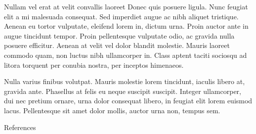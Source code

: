 \documentclass[final]{beamer}
\newlength{\sepwidth}
\newlength{\colwidth}
\newcommand{\separatorcolumn}{\begin{column}{\sepwidth}\end{column}}
\begin{document}
\begin{frame}[label={sec:orgc24fd89}]{}
\begin{block}{}
\begin{columns}
\begin{column}{\colwidth\columnwidth}
\begin{block}{Nullam vel erat at velit convallis laoreet}
Donec quis posuere ligula. Nunc feugiat elit a mi malesuada consequat. Sed
imperdiet augue ac nibh aliquet tristique. Aenean eu tortor vulputate, eleifend
lorem in, dictum urna. Proin auctor ante in augue tincidunt tempor. Proin
pellentesque vulputate odio, ac gravida nulla posuere efficitur. Aenean at velit
vel dolor blandit molestie. Mauris laoreet commodo quam, non luctus nibh
ullamcorper in. Class aptent taciti sociosqu ad litora torquent per conubia
nostra, per inceptos himenaeos.

Nulla varius finibus volutpat. Mauris molestie lorem tincidunt, iaculis libero
at, gravida ante. Phasellus at felis eu neque suscipit suscipit.  Integer
ullamcorper, dui nec pretium ornare, urna dolor consequat libero, in feugiat
elit lorem euismod lacus. Pellentesque sit amet dolor mollis, auctor urna non,
tempus sem.
\end{block}

\begin{block}{References}
\nocite{*}
\footnotesize{}

\separatorcolumn
\end{block}
\end{column}
\end{columns}
\end{block}
\end{frame}
\end{document}
